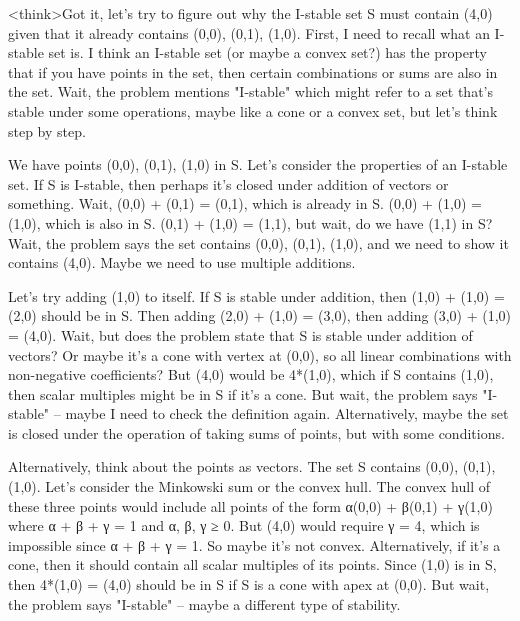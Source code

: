 <think>Got it, let's try to figure out why the I-stable set S must contain (4,0) given that it already contains (0,0), (0,1), (1,0). First, I need to recall what an I-stable set is. I think an I-stable set (or maybe a convex set?) has the property that if you have points in the set, then certain combinations or sums are also in the set. Wait, the problem mentions "I-stable" which might refer to a set that's stable under some operations, maybe like a cone or a convex set, but let's think step by step.

We have points (0,0), (0,1), (1,0) in S. Let's consider the properties of an I-stable set. If S is I-stable, then perhaps it's closed under addition of vectors or something. Wait, (0,0) + (0,1) = (0,1), which is already in S. (0,0) + (1,0) = (1,0), which is also in S. (0,1) + (1,0) = (1,1), but wait, do we have (1,1) in S? Wait, the problem says the set contains (0,0), (0,1), (1,0), and we need to show it contains (4,0). Maybe we need to use multiple additions.

Let's try adding (1,0) to itself. If S is stable under addition, then (1,0) + (1,0) = (2,0) should be in S. Then adding (2,0) + (1,0) = (3,0), then adding (3,0) + (1,0) = (4,0). Wait, but does the problem state that S is stable under addition of vectors? Or maybe it's a cone with vertex at (0,0), so all linear combinations with non-negative coefficients? But (4,0) would be 4*(1,0), which if S contains (1,0), then scalar multiples might be in S if it's a cone. But wait, the problem says "I-stable" – maybe I need to check the definition again. Alternatively, maybe the set is closed under the operation of taking sums of points, but with some conditions.

Alternatively, think about the points as vectors. The set S contains (0,0), (0,1), (1,0). Let's consider the Minkowski sum or the convex hull. The convex hull of these three points would include all points of the form α(0,0) + β(0,1) + γ(1,0) where α + β + γ = 1 and α, β, γ ≥ 0. But (4,0) would require γ = 4, which is impossible since α + β + γ = 1. So maybe it's not convex. Alternatively, if it's a cone, then it should contain all scalar multiples of its points. Since (1,0) is in S, then 4*(1,0) = (4,0) should be in S if S is a cone with apex at (0,0). But wait, the problem says "I-stable" – maybe a different type of stability.

